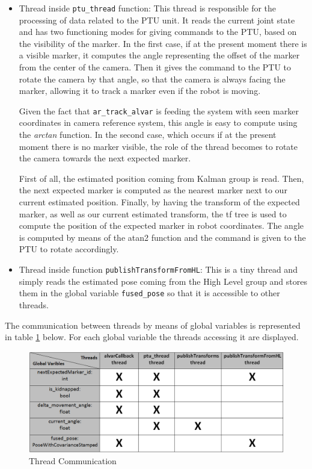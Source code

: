 \begin{itemize}
\item Thread inside \texttt{ptu\_thread} function: This thread is responsible for the processing of data related to the PTU unit. It reads the current joint state and has two functioning modes for giving commands to the PTU, based on the visibility of the marker. In the first case, if at the present moment  there is a visible marker, it computes the angle representing the offset of the marker from the center of the camera. Then it gives the command to the PTU to rotate the camera by that angle, so that the camera is always facing the marker, allowing it to track a marker even if the robot is moving.

Given the fact that \texttt{ar\_track\_alvar} is feeding the system with seen marker coordinates in camera reference system, this angle is easy to compute using the \textit{arctan} function. In the second case, which occurs if at the present moment there is no marker visible, the role of the thread becomes to rotate the camera towards the next expected marker.

First of all, the estimated position coming from Kalman group is read. Then, the next expected marker is computed as the nearest marker next to our current estimated position. Finally, by having the transform of the expected marker, as well as our current estimated transform, the tf tree is used to compute the position of the expected marker in robot coordinates. The angle is computed by means of the atan2 function and the command is given to the PTU to rotate accordingly.

\item Thread inside function \texttt{publishTransformFromHL}: This is a tiny thread and simply reads the estimated pose coming from the High Level group and stores them in the global variable \texttt{fused\_pose} so that it is accessible to other threads.
\end{itemize}

The communication between threads by means of global variables is represented in table \ref{Thread Communication} below. For each global variable the threads accessing it are displayed.

\begin{figure}
\begin{center}
\includegraphics[width = \linewidth]{graphics/vision_threads.png}
\caption{Thread Communication}
\label{Thread Communication}
\end{center}
\end{figure}

